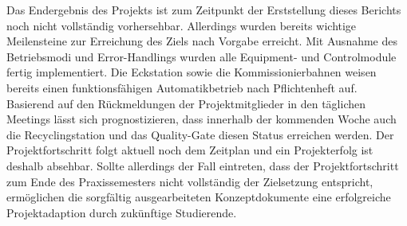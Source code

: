 Das Endergebnis des Projekts ist zum Zeitpunkt der Erststellung dieses Berichts
noch nicht vollständig vorhersehbar. Allerdings wurden bereits wichtige
Meilensteine zur Erreichung des Ziels nach Vorgabe erreicht. Mit Ausnahme des
Betriebsmodi und Error-Handlings wurden alle Equipment- und Controlmodule
fertig implementiert. Die Eckstation sowie die Kommissionierbahnen weisen
bereits einen funktionsfähigen Automatikbetrieb nach Pflichtenheft auf. Basierend
auf den Rückmeldungen der Projektmitglieder in den täglichen Meetings lässt sich
prognostizieren, dass innerhalb der kommenden Woche auch die Recyclingstation
und das Quality-Gate diesen Status erreichen werden. Der Projektfortschritt folgt
aktuell noch dem Zeitplan und ein Projekterfolg ist deshalb absehbar. Sollte
allerdings der Fall eintreten, dass der Projektfortschritt zum Ende des
Praxissemesters nicht vollständig der Zielsetzung entspricht, ermöglichen die
sorgfältig ausgearbeiteten Konzeptdokumente eine erfolgreiche Projektadaption
durch zukünftige Studierende.


